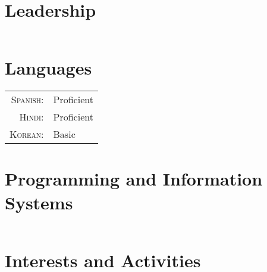 \documentclass[a4paper,10pt]{article}
\begin{document}
\section{Leadership}
\begin{tabular}{rl}

\end{tabular}

\section{Languages}
\begin{tabular}{rl}
\textsc{Spanish:}&Proficient\\
\textsc{Hindi:}&Proficient\\
\textsc{Korean:}&Basic\\
\end{tabular}

\section{Programming and Information Systems}
\begin{tabular}{rl}
\end{tabular}

\section{Interests and Activities}
\end{document}
